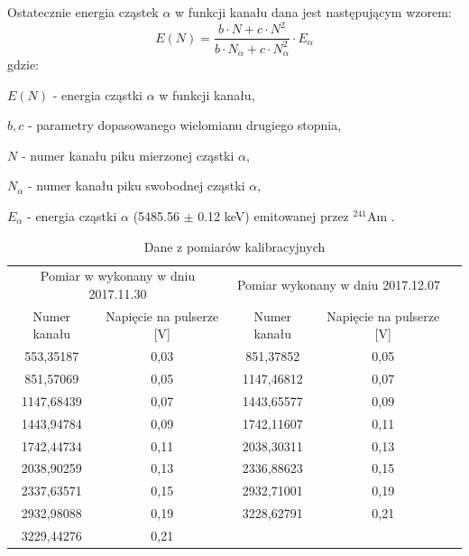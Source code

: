 \documentclass[12pt,a4paper]{article}
\newcommand{\Ameryk}{${}^{241}_{}{}$Am }
\begin{document}
Ostatecznie energia cząstek $\alpha$ w funkcji kanału dana jest następującym wzorem:
\[
\label{wzorenergia}
E(N)= \frac{b \cdot N+c \cdot N^2}{b \cdot  N_\alpha+c \cdot N_\alpha ^2 } \cdot E_\alpha\] 
gdzie: 

$E(N)$ - energia cząstki $\alpha$ w funkcji kanału, 

 $b,c$ - parametry dopasowanego wielomianu drugiego stopnia, 
 
 $N$ - numer kanału piku mierzonej cząstki $\alpha$, 
 
 $N_\alpha$ - numer kanału piku swobodnej cząstki $\alpha$,
 
  $E_\alpha$ - energia cząstki $\alpha$ (5485.56 $\pm$ 0.12 keV) emitowanej przez \Ameryk.

\begin{table}[H]
\centering
\caption{Dane z pomiarów kalibracyjnych}
\label{kalibracja_tab}
\begin{tabular}{|c|c|ccl}
\cline{1-4}
\multicolumn{2}{|c|}{Pomiar w wykonany w dniu 2017.11.30} & \multicolumn{2}{c|}{Pomiar wykonany w dniu 2017.12.07}                                &  \\ \cline{1-4}
Numer kanału        & Napięcie na pulserze {[}V{]}        & \multicolumn{1}{c|}{Numer kanału} & \multicolumn{1}{c|}{Napięcie na pulserze {[}V{]}} &  \\ \cline{1-4}
553,35187           & 0,03                                & \multicolumn{1}{c|}{851,37852}    & \multicolumn{1}{c|}{0,05}                         &  \\ \cline{1-4}
851,57069           & 0,05                                & \multicolumn{1}{c|}{1147,46812}   & \multicolumn{1}{c|}{0,07}                         &  \\ \cline{1-4}
1147,68439          & 0,07                                & \multicolumn{1}{c|}{1443,65577}   & \multicolumn{1}{c|}{0,09}                         &  \\ \cline{1-4}
1443,94784          & 0,09                                & \multicolumn{1}{c|}{1742,11607}   & \multicolumn{1}{c|}{0,11}                         &  \\ \cline{1-4}
1742,44734          & 0,11                                & \multicolumn{1}{c|}{2038,30311}   & \multicolumn{1}{c|}{0,13}                         &  \\ \cline{1-4}
2038,90259          & 0,13                                & \multicolumn{1}{c|}{2336,88623}   & \multicolumn{1}{c|}{0,15}                         &  \\ \cline{1-4}
2337,63571          & 0,15                                & \multicolumn{1}{c|}{2932,71001}   & \multicolumn{1}{c|}{0,19}                         &  \\ \cline{1-4}
2932,98088          & 0,19                                & \multicolumn{1}{c|}{3228,62791}   & \multicolumn{1}{c|}{0,21}                         &  \\ \cline{1-4}
3229,44276          & 0,21                                &                                   &                                                   &  \\ \cline{1-2}
\end{tabular}
\end{table}
\end{document}
